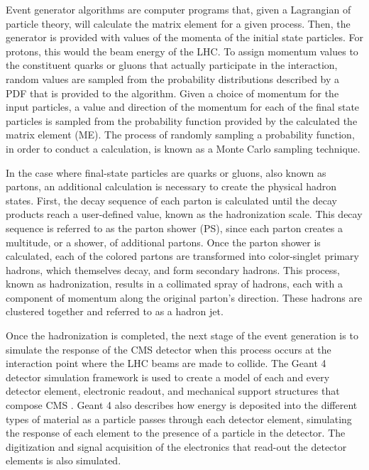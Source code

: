\par Event generator algorithms are computer programs
that, given a Lagrangian of particle theory, will calculate the
matrix element for a given process.  Then, the generator is provided
with values of the momenta of the initial state particles.  For
protons, this would the beam energy of the LHC.  To assign momentum
values to the constituent quarks or gluons that actually participate
in the interaction, random values are sampled from the probability
distributions described by a PDF that is provided to the algorithm.
Given a choice of momentum for the input particles, a value and
direction of the momentum for each of the final state particles is
sampled from the probability function provided by the calculated the
matrix element (ME).  The process of randomly sampling a probability
function, in order to conduct a calculation, is known as a Monte Carlo
sampling technique.    

\par In the case where final-state particles are quarks or gluons,
also known as partons, an additional calculation is necessary to
create the physical hadron states.  First, the decay sequence of each
parton is calculated until the decay products reach a user-defined
value, known as the hadronization scale.  This decay sequence is
referred to as the parton shower (PS), since each parton creates a
multitude, or a shower, of additional partons.  Once the parton shower
is calculated, each of the colored partons are transformed into
color-singlet primary hadrons, which themselves decay, and form
secondary hadrons.  This process, known as hadronization, results in a
collimated spray of hadrons, each with a component of momentum along
the original parton's direction.  These hadrons are clustered together
and referred to as a hadron jet.   

\par Once the hadronization is completed, the next stage of the event
generation is to simulate the response of the CMS detector when this
process occurs at the interaction point where the LHC beams are made
to collide.  The Geant 4 detector simulation framework is used to
create a model of each and every detector element, electronic readout,
and mechanical support structures that compose CMS \cite{Schalicke:2011zz}.  Geant 4 also
describes how energy is deposited into the different types of material
as a particle passes through each detector element, simulating the
response of each element to the presence of a particle in the 
detector.  The digitization and signal acquisition of the electronics
that read-out the detector elements is also simulated.  

